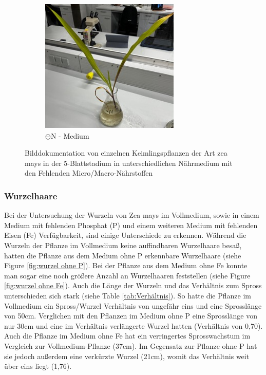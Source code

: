 \documentclass[10pt,a4paper]{article}
\begin{document}
\begin{figure}[H]
\begin{subfigure}[b]{0.45\textwidth}
				\includegraphics[width=\textwidth]{MinusN.jpg}
				\caption{$\ominus$N - Medium}
				\label{fig:minus N}
				\end{subfigure}
			
			\caption{Bilddokumentation von einzelnen Keimlingspflanzen der Art zea mays in der 5-Blattstadium in unterschiedlichen Nährmedium mit den Fehlenden Micro/Macro-Nährstoffen}
			\label{Mangel}
		\end{figure}
		
		\subsubsection{Wurzelhaare}
		Bei der Untersuchung der Wurzeln von Zea mays im Vollmedium, sowie in einem Medium mit fehlenden Phosphat (P)  und einem weiteren Medium mit fehlenden Eisen (Fe) Verfügbarkeit, sind einige Unterschiede zu erkennen. Während die Wurzeln der Pflanze im Vollmedium keine auffindbaren Wurzelhaare besaß, hatten die Pflanze aus dem Medium ohne P erkennbare Wurzelhaare (siehe Figure \ref{fig:wurzel ohne P}). Bei der Pflanze aus dem Medium ohne Fe konnte man sogar eine noch größere Anzahl an Wurzelhaaren feststellen (siehe Figure \ref{fig:wurzel ohne Fe}). Auch die Länge der Wurzeln und das Verhältnis zum Spross unterschieden sich stark (siehe Table \ref{tab:Verhältnis}). So hatte die Pflanze im Vollmedium ein Spross/Wurzel Verhältnis von ungefähr eins und eine Sprosslänge von 50cm. Verglichen mit den Pflanzen im Medium ohne P eine Sprosslänge von nur 30cm und eine im Verhältnis verlängerte Wurzel hatten (Verhältnis von 0,70). Auch die Pflanze im Medium ohne Fe hat ein verringertes Sprosswachstum im Vergleich zur Vollmedium-Pflanze (37cm). Im Gegensatz zur Pflanze ohne P hat sie jedoch außerdem eine verkürzte Wurzel (21cm), womit das Verhältnis weit über eins liegt (1,76).
		
\end{document}
